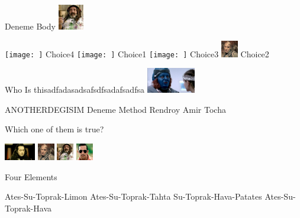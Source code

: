 \documentclass{exam}
\begin{document}
\begin{questions}
\question Deneme Body\newline
\includegraphics[height=3em]{faruk.jpg} \newline
\begin{oneparchoices}
\choice \texttt{[image: ]}
Choice4
\choice \texttt{[image: ]}
Choice1
\choice \texttt{[image: ]}
Choice3
\choice \includegraphics[height=2em]{216.jpg}
Choice2
\end{oneparchoices}
\question Who Is thisadfadasadsafsdfsadafsadfsa\newline
\includegraphics[height=3em]{rendroy2.jpg} \newline
\begin{oneparchoices}
\choice ANOTHERDEGISIM
\choice Deneme Method
\choice Rendroy
\choice Amir Tocha
\end{oneparchoices}
\question Which one of them is true?\newline
\begin{oneparchoices}
\choice \includegraphics[height=2em]{komutanlogar.jpeg}
\choice \includegraphics[height=2em]{216.jpg}
\choice \includegraphics[height=2em]{faruk.jpg}
\choice \includegraphics[height=2em]{arifisik.jpg}
\end{oneparchoices}
\question Four Elements\newline
\begin{oneparchoices}
\choice Ates-Su-Toprak-Limon
\choice Ates-Su-Toprak-Tahta
\choice Su-Toprak-Hava-Patates
\choice Ates-Su-Toprak-Hava

\end{oneparchoices}
\end{questions}
\end{document}
